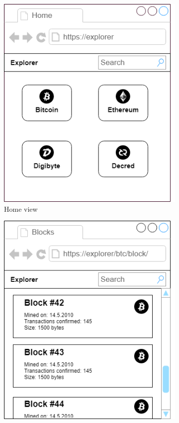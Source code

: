 \begin{figure}[h]
    \centering
    \begin{subfigure}[b]{.4\textwidth}
        \centering
        \includegraphics[width=1.0\linewidth]{mockups/home.png}
        \caption{Home view}
        \label{homeMockup}
    \end{subfigure}
    \begin{subfigure}[b]{.4\textwidth}
        \centering
        \includegraphics[width=1.0\linewidth]{mockups/blocks.png}

\end{subfigure}
\end{figure}
